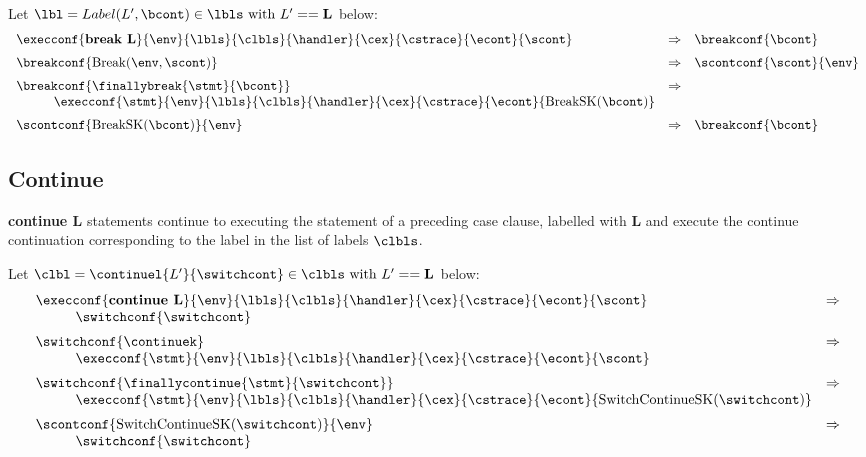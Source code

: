 \documentclass{article}
\begin{document}
Let $\lbl = Label(L', \bcont) \in \lbls \textrm{ with } L' == \mathbf{L}$ below:
\[
  \begin{array}{lcl}
	\execconf{\textbf{break L}}{\env}{\lbls}{\clbls}{\handler}{\cex}{\cstrace}{\econt}{\scont}
	& \Rightarrow &
	\breakconf{\bcont}\\[2mm]

	\breakconf{\mathrm{Break}(\env, \scont)}
	& \Rightarrow &
	\scontconf{\scont}{\env}\\[2mm]

	\breakconf{\finallybreak{\stmt}{\bcont}}
	& \Rightarrow \\
	\hspace{10mm}\execconf{\stmt}{\env}{\lbls}{\clbls}{\handler}{\cex}{\cstrace}{\econt}{\mathrm{BreakSK}(\bcont)}\\[2mm]

	\scontconf{\mathrm{BreakSK}(\bcont)}{\env}
	& \Rightarrow &
	\breakconf{\bcont}

  \end{array}
\]

\subsection{Continue}
\textbf{continue L} statements continue to executing the statement of a preceding case clause, labelled with \textbf{L} and execute the continue continuation corresponding to the label in the list of labels $\clbls$.

Let $\clbl = \continuel{L'}{\switchcont} \in \clbls \textrm{ with } L' == \mathbf{L}$ below:
\[
  \begin{array}{lcl}
	\execconf{\textbf{continue L}}{\env}{\lbls}{\clbls}{\handler}{\cex}{\cstrace}{\econt}{\scont}
	& \Rightarrow \\
	\hspace{10mm}\switchconf{\switchcont}\\[2mm]

	\switchconf{\continuek}
	& \Rightarrow \\
	\hspace{10mm}\execconf{\stmt}{\env}{\lbls}{\clbls}{\handler}{\cex}{\cstrace}{\econt}{\scont}\\[2mm]

	\switchconf{\finallycontinue{\stmt}{\switchcont}}
	& \Rightarrow \\
	\hspace{10mm}\execconf{\stmt}{\env}{\lbls}{\clbls}{\handler}{\cex}{\cstrace}{\econt}{\mathrm{SwitchContinueSK}(\switchcont)}\\[2mm]

	\scontconf{\mathrm{SwitchContinueSK}(\switchcont)}{\env}
	& \Rightarrow \\
	\hspace{10mm}\switchconf{\switchcont}
  \end{array}
\]
\end{document}
